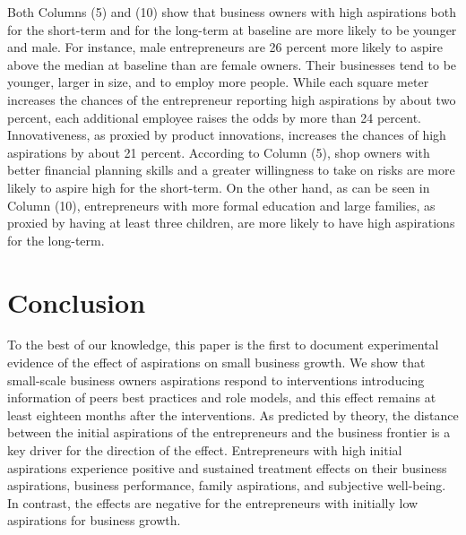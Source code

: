 \documentclass[11.5pt]{article}
\begin{document}
Both Columns (5) and (10) show that business owners with high aspirations both for the short-term and for the long-term at baseline are more likely to be younger and male. For instance, male entrepreneurs are 26 percent more likely to aspire above the median at baseline than are female owners. Their businesses tend to be younger, larger in size, and to employ more people. While each square meter increases the chances of the entrepreneur reporting high aspirations by about two percent, each additional employee raises the odds by more than 24 percent. Innovativeness, as proxied by product innovations, increases the chances of high aspirations by about 21 percent. According to Column (5), shop owners with better financial planning skills and a greater willingness to take on risks are more likely to aspire high for the short-term. On the other hand, as can be seen in Column (10), entrepreneurs with more formal education and large families, as proxied by having at least three children, are more likely to have high aspirations for the long-term.



\section{Conclusion}\label{sec.conc}

To the best of our knowledge, this paper is the first to document experimental evidence of the effect of aspirations on small
business growth. %
We show that small-scale business owners aspirations respond to interventions introducing information of peers best practices and role models, and this effect remains at least eighteen months after the interventions. As predicted by theory, the distance between the initial aspirations of the entrepreneurs and the business frontier is a key driver for the direction of the effect. Entrepreneurs with high initial aspirations experience positive and sustained treatment effects on their business aspirations, business performance, family aspirations, and subjective well-being. In contrast, the effects are negative for the entrepreneurs with initially low aspirations for business growth. %
\end{document}
